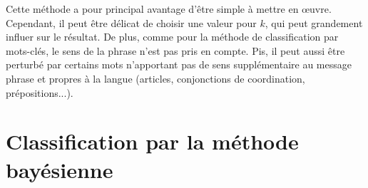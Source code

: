 \documentclass[12pt,a4paper]{report}
\begin{document}
Cette méthode a pour principal avantage d'être simple à mettre en œuvre.
Cependant, il peut être délicat de choisir une valeur pour $k$, qui peut
grandement influer sur le résultat. De plus, comme pour la méthode de
classification par mots-clés, le sens de la phrase n'est pas pris en compte.
Pis, il peut aussi être perturbé par certains mots n'apportant pas de sens
supplémentaire au message phrase et propres à la langue (articles, conjonctions
de coordination, prépositions...).

\section{Classification par la méthode bayésienne}


\end{document}
